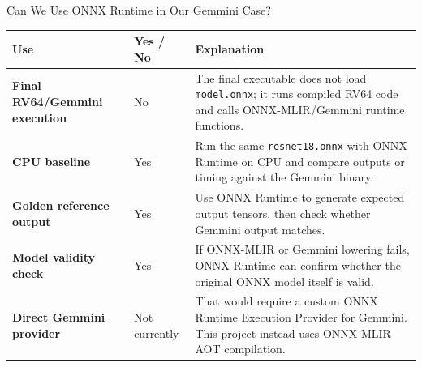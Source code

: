 \documentclass[aspectratio=169,10pt]{beamer}
\newcommand{\code}[1]{\texttt{\footnotesize #1}}
\newcommand{\edgeword}[1]{\textcolor{red!75!black}{\textbf{#1}}}
\begin{document}
\begin{frame}{Can We Use ONNX Runtime in Our Gemmini Case?}
  \scriptsize
  \begin{tabularx}{\textwidth}{@{}lXX@{}}
    \toprule
    Use & Yes / No & Explanation \\
    \midrule
    \edgeword{Final RV64/Gemmini execution} &
      No &
      The final executable does not load \code{model.onnx}; it runs compiled RV64 code and calls ONNX-MLIR/Gemmini runtime functions. \\
    \edgeword{CPU baseline} &
      Yes &
      Run the same \code{resnet18.onnx} with ONNX Runtime on CPU and compare outputs or timing against the Gemmini binary. \\
    \edgeword{Golden reference output} &
      Yes &
      Use ONNX Runtime to generate expected output tensors, then check whether Gemmini output matches. \\
    \edgeword{Model validity check} &
      Yes &
      If ONNX-MLIR or Gemmini lowering fails, ONNX Runtime can confirm whether the original ONNX model itself is valid. \\
    \edgeword{Direct Gemmini provider} &
      Not currently &
      That would require a custom ONNX Runtime Execution Provider for Gemmini. This project instead uses ONNX-MLIR AOT compilation. \\
    \bottomrule
  \end{tabularx}
\end{frame}
\end{document}
